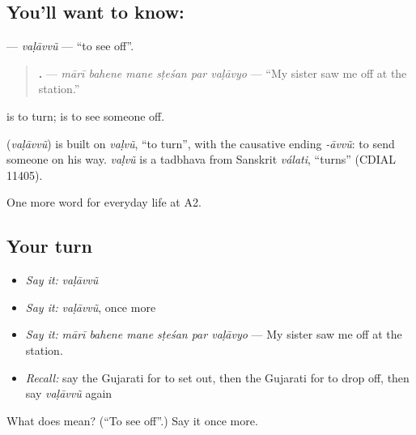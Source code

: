 \subsection*{You'll want to know: }
\textbf{} — \emph{vaḷāvvũ} — \textquotedblleft{}to see off\textquotedblright{}.

\begin{quote}
\textbf{     .} — \emph{mārī bahene mane sṭeśan par vaḷāvyo} — \textquotedblleft{}My sister saw me off at the station.\textquotedblright{}
\end{quote}

\textbf{} is to turn; \textbf{} is to see someone off.

\begin{cousinweb}
\textbf{} (\emph{vaḷāvvũ}) is built on \emph{vaḷvũ}, \textquotedblleft{}to turn\textquotedblright{}, with the causative ending \emph{-āvvũ}: to send someone on his way. \emph{vaḷvũ} is a tadbhava from Sanskrit \emph{válati}, \textquotedblleft{}turns\textquotedblright{} (CDIAL 11405).
\end{cousinweb}

\begin{grammarlens}[title={What you've built}]
One more word for everyday life at A2.
\end{grammarlens}

\subsection*{Your turn}
\begin{itemize}
\raggedright
  \item \emph{Say it:} \emph{vaḷāvvũ}
  \item \emph{Say it:} \emph{vaḷāvvũ}, once more
  \item \emph{Say it:} \emph{mārī bahene mane sṭeśan par vaḷāvyo} — My sister saw me off at the station.
  \item \emph{Recall:} say the Gujarati for to set out, then the Gujarati for to drop off, then say \emph{vaḷāvvũ} again
\end{itemize}

\begin{tcolorbox}[breakable,colback=teal!4,colframe=teal!35!black,title={Before you move on}]
What does  mean? (\textquotedblleft{}To see off\textquotedblright{}.) Say it once more.
\end{tcolorbox}
